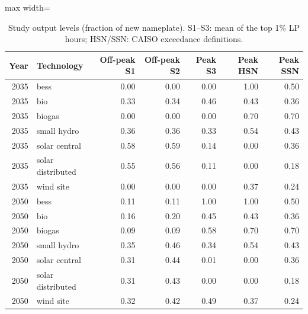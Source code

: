 \begin{table}[!htbp]
\centering
\scriptsize
\caption{Study output levels (fraction of new nameplate). S1–S3: mean of the top 1\% LP hours; HSN/SSN: CAISO exceedance definitions.}
\label{tab:factors}
\begin{adjustbox}{max width=\linewidth}
\begin{tabular}{rlrrrrr}
\toprule
Year & Technology & Off-peak S1 & Off-peak S2 & Peak S3 & Peak HSN & Peak SSN \\
\midrule
2035 & bess & 0.00 & 0.00 & 0.00 & 1.00 & 0.50 \\
2035 & bio & 0.33 & 0.34 & 0.46 & 0.43 & 0.36 \\
2035 & biogas & 0.00 & 0.00 & 0.00 & 0.70 & 0.70 \\
2035 & small hydro & 0.36 & 0.36 & 0.33 & 0.54 & 0.43 \\
2035 & solar central & 0.58 & 0.59 & 0.14 & 0.00 & 0.36 \\
2035 & solar distributed & 0.55 & 0.56 & 0.11 & 0.00 & 0.18 \\
2035 & wind site & 0.00 & 0.00 & 0.00 & 0.37 & 0.24 \\
2050 & bess & 0.11 & 0.11 & 1.00 & 1.00 & 0.50 \\
2050 & bio & 0.16 & 0.20 & 0.45 & 0.43 & 0.36 \\
2050 & biogas & 0.09 & 0.09 & 0.58 & 0.70 & 0.70 \\
2050 & small hydro & 0.35 & 0.46 & 0.34 & 0.54 & 0.43 \\
2050 & solar central & 0.31 & 0.44 & 0.01 & 0.00 & 0.36 \\
2050 & solar distributed & 0.31 & 0.43 & 0.00 & 0.00 & 0.18 \\
2050 & wind site & 0.32 & 0.42 & 0.49 & 0.37 & 0.24 \\
\bottomrule
\end{tabular}
\end{adjustbox}
\end{table}
